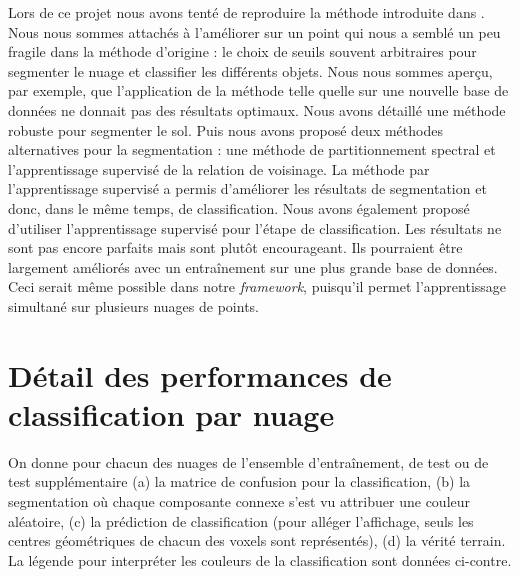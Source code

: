 \documentclass[a4paper, onecolumn, 11pt]{article}
\begin{document}
Lors de ce projet nous avons tenté de reproduire la méthode introduite dans \cite{aka_article}. Nous nous sommes attachés à l'améliorer sur un point qui nous a semblé un peu fragile dans la méthode d'origine : le choix de seuils souvent arbitraires pour segmenter le nuage et classifier les différents objets. Nous nous sommes aperçu, par exemple, que l'application de la méthode telle quelle sur une nouvelle base de données ne donnait pas des résultats optimaux. Nous avons détaillé une méthode robuste pour segmenter le sol. Puis nous avons proposé deux méthodes alternatives pour la segmentation : une méthode de partitionnement spectral et l'apprentissage supervisé de la relation de voisinage. La méthode par l'apprentissage supervisé a permis d'améliorer les résultats de segmentation et donc, dans le même temps, de classification. Nous avons également proposé d'utiliser l'apprentissage supervisé pour l'étape de classification. Les résultats ne sont pas encore parfaits mais sont plutôt encourageant. Ils pourraient être largement améliorés avec un entraînement sur une plus grande base de données. Ceci serait même possible dans notre \emph{framework}, puisqu'il permet l'apprentissage simultané sur plusieurs nuages de points.

\newpage

\nocite{*}



\newpage
\appendix
\section{Détail des performances de classification par nuage}

\begin{figure}
\centering
{}
\end{figure}

On donne pour chacun des nuages de l'ensemble d'entraînement, de test ou de test supplémentaire (a) la matrice de confusion pour la classification, (b) la segmentation où chaque composante connexe s'est vu attribuer une couleur aléatoire, (c) la prédiction de classification (pour alléger l'affichage, seuls les centres géométriques de chacun des voxels sont représentés), (d) la vérité terrain. La légende pour interpréter les couleurs de la classification sont données ci-contre.
\end{document}
